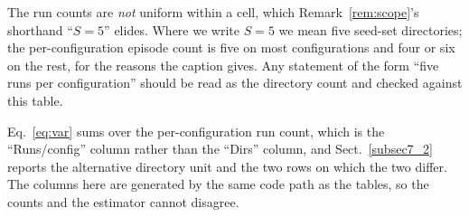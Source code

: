 \documentclass[pdflatex,iicol,sn-apa]{sn-jnl}
\theoremstyle{remark}
\begin{document}
\begin{appendices}
The run counts are \emph{not} uniform within a cell, which Remark~\ref{rem:scope}'s shorthand
``$S = 5$'' elides. Where we write $S = 5$ we mean five seed-set directories; the per-configuration
episode count is five on most configurations and four or six on the rest, for the reasons the
caption gives. Any statement of the form ``five runs per configuration'' should be read as the
directory count and checked against this table.

Eq.~\eqref{eq:var} sums over the per-configuration run count, which is the ``Runs/config'' column
rather than the ``Dirs'' column, and Sect.~\ref{subsec7_2} reports the alternative directory unit
and the two rows on which the two differ. The columns here are generated by the same code path as
the tables, so the counts and the estimator cannot disagree.


\end{appendices}
\end{document}
